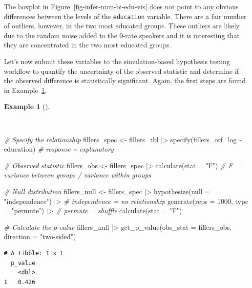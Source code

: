 \documentclass[
  letterpaper,
  krantz1]{latex/krantz-mod}
\newenvironment{Shaded}{\begin{snugshade}}{\end{snugshade}}
\newcommand{\AttributeTok}[1]{\textcolor[rgb]{0.00,0.00,0.00}{#1}}
\newcommand{\CommentTok}[1]{\textcolor[rgb]{0.00,0.00,0.00}{\textit{#1}}}
\newcommand{\DecValTok}[1]{\textcolor[rgb]{0.00,0.00,0.00}{#1}}
\newcommand{\FunctionTok}[1]{\textcolor[rgb]{0.00,0.00,0.00}{#1}}
\newcommand{\NormalTok}[1]{\textcolor[rgb]{0.00,0.00,0.00}{#1}}
\newcommand{\OtherTok}[1]{\textcolor[rgb]{0.00,0.00,0.00}{#1}}
\newcommand{\SpecialCharTok}[1]{\textcolor[rgb]{0.00,0.00,0.00}{#1}}
\newcommand{\StringTok}[1]{\textcolor[rgb]{0.00,0.00,0.00}{#1}}
\theoremstyle{definition}
\newtheorem{example}{Example}[chapter]
\theoremstyle{definition}
\theoremstyle{remark}
\begin{document}
The boxplot in Figure~\ref{fig-infer-num-bi-edu-vis} does not point to
any obvious differences between the levels of the \texttt{education}
variable. There are a fair number of outliers, however, in the two most
educated groups. These outliers are likely due to the random noise added
to the 0-rate speakers and it is interesting that they are concentrated
in the two most educated groups.

Let's now submit these variables to the simulation-based hypothesis
testing workflow to quantify the uncertainty of the observed statistic
and determine if the observed difference is statistically significant.
Again, the first steps are found in Example~\ref{exm-infer-num-bi-edu}.

\pagebreak

\begin{example}[]\protect\hypertarget{exm-infer-num-bi-edu}{}\label{exm-infer-num-bi-edu}

~

\begin{Shaded}
\begin{Highlighting}[numbers=left,,]
\CommentTok{\# Specify the relationship}
\NormalTok{fillers\_spec }\OtherTok{\textless{}{-}}
\NormalTok{  fillers\_tbl }\SpecialCharTok{|\textgreater{}}
  \FunctionTok{specify}\NormalTok{(fillers\_orf\_log }\SpecialCharTok{\textasciitilde{}}\NormalTok{ education) }\CommentTok{\# response \textasciitilde{} explanatory}

\CommentTok{\# Observed statistic}
\NormalTok{fillers\_obs }\OtherTok{\textless{}{-}}
\NormalTok{  fillers\_spec }\SpecialCharTok{|\textgreater{}}
  \FunctionTok{calculate}\NormalTok{(}\AttributeTok{stat =} \StringTok{"F"}\NormalTok{) }\CommentTok{\# F = variance between groups / variance within groups}

\CommentTok{\# Null distribution}
\NormalTok{fillers\_null }\OtherTok{\textless{}{-}}
\NormalTok{  fillers\_spec }\SpecialCharTok{|\textgreater{}}
  \FunctionTok{hypothesize}\NormalTok{(}\AttributeTok{null =} \StringTok{"independence"}\NormalTok{) }\SpecialCharTok{|\textgreater{}} \CommentTok{\# independence = no relationship}
  \FunctionTok{generate}\NormalTok{(}\AttributeTok{reps =} \DecValTok{1000}\NormalTok{, }\AttributeTok{type =} \StringTok{"permute"}\NormalTok{) }\SpecialCharTok{|\textgreater{}} \CommentTok{\# permute = shuffle}
  \FunctionTok{calculate}\NormalTok{(}\AttributeTok{stat =} \StringTok{"F"}\NormalTok{)}

\CommentTok{\# Calculate the $p${-}value}
\NormalTok{fillers\_null }\SpecialCharTok{|\textgreater{}}
  \FunctionTok{get\_p\_value}\NormalTok{(}\AttributeTok{obs\_stat =}\NormalTok{ fillers\_obs, }\AttributeTok{direction =} \StringTok{"two{-}sided"}\NormalTok{)}
\end{Highlighting}
\end{Shaded}

\begin{verbatim}
# A tibble: 1 x 1
  p_value
    <dbl>
1   0.426
\end{verbatim}

\end{example}
\end{document}
